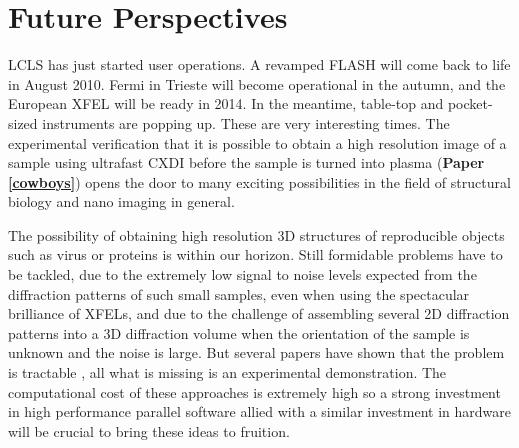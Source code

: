 \chapter{Future Perspectives}\label{Future Perspectives}\noindent

LCLS has just started user operations. A revamped FLASH will come back to life
in August 2010. Fermi in Trieste will become operational in the autumn, and the
European XFEL will be ready in 2014. In the meantime, table-top and pocket-sized
instruments are popping up. These are very interesting times. The experimental
verification that it is possible to obtain a high resolution image of a sample
using ultrafast CXDI before the sample is turned into plasma ({\bf Paper
  \ref{cowboys}}) opens the door to many exciting possibilities in the field of
structural biology and nano imaging in general.

The possibility of obtaining high resolution 3D structures of reproducible
objects such as virus or proteins is within our horizon. Still formidable
problems have to be tackled, due to the extremely low signal to noise levels
expected from the diffraction patterns of such small samples, even when using
the spectacular brilliance of XFELs, and due to the challenge of assembling
several 2D diffraction patterns into a 3D diffraction volume when the
orientation of the sample is unknown and the noise is large. But several papers
have shown that the problem is tractable \cite{Veit2009Noise,NeTeDuaneLoh2009Reconstruction,Fung2008Structure}, all
what is missing is an experimental demonstration. The computational cost of
these approaches is extremely high so a strong investment in high
performance parallel software allied with a similar investment in hardware will
be crucial to bring these ideas to fruition.



